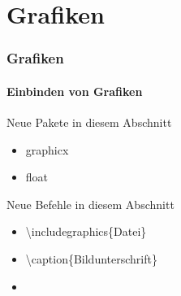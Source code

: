 \section{Grafiken}
\begin{frame}
\frametitle{Grafiken}
\framesubtitle{Einbinden von Grafiken} 
\begin{exampleblock}{Neue Pakete in diesem Abschnitt}
\begin{itemize}
\item graphicx 
\item float
\end{itemize}
\end{exampleblock}

\begin{block}{Neue Befehle in diesem Abschnitt}
\begin{itemize}
\item \color{nounibaredI}\textbackslash includegraphics\color{black}\{Datei\}
\item \color{nounibaredI}\textbackslash caption\color{black}\{Bildunterschrift\}
\item {}
\end{itemize}
\end{block}

\end{frame}


